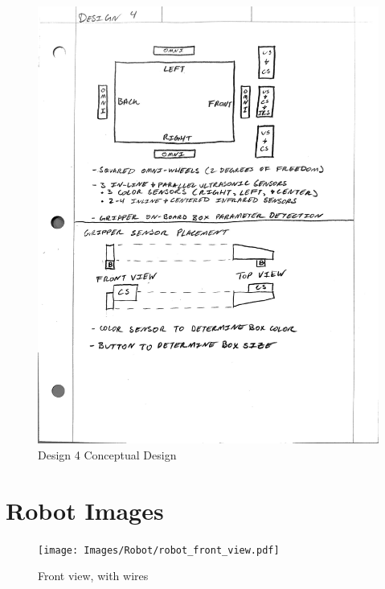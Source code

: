 \documentclass[12pt]{report}
\begin{document}
\begin{figure}[H]
    \centering
    \includegraphics[width=1\textwidth]{Images/Designs/Design4.pdf}
    \caption{Design 4 Conceptual Design}
    \label{fig:design4}
\end{figure}

\section{Robot Images}

\begin{figure}[H]
    \centering
    \texttt{[image: Images/Robot/robot\_front\_view.pdf]}
    \caption{Front view, with wires}
    \label{fig:front-view}
\end{figure}
\end{document}
